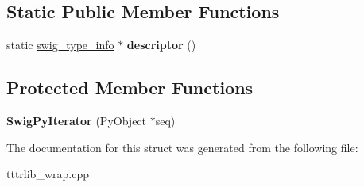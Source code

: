 \subsection*{Static Public Member Functions}
\begin{DoxyCompactItemize}
\item 
\mbox{\label{structswig_1_1_swig_py_iterator_ac77f47f6ed06f7113252940588a3f39e}} 
static \hyperlink{structswig__type__info}{swig\+\_\+type\+\_\+info} $\ast$ {\bfseries descriptor} ()
\end{DoxyCompactItemize}
\subsection*{Protected Member Functions}
\begin{DoxyCompactItemize}
\item 
\mbox{\label{structswig_1_1_swig_py_iterator_a88c0a14160ab680c8251f61e01b38d77}} 
{\bfseries Swig\+Py\+Iterator} (Py\+Object $\ast$seq)
\end{DoxyCompactItemize}


The documentation for this struct was generated from the following file\+:\begin{DoxyCompactItemize}
\item 
tttrlib\+\_\+wrap.\+cpp\end{DoxyCompactItemize}
